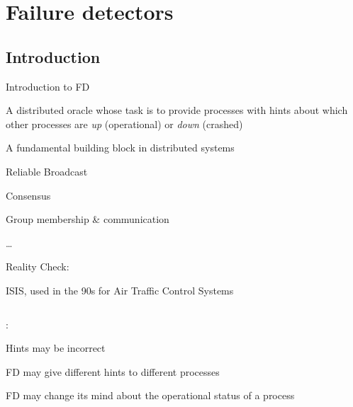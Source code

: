 \section{Failure detectors}

\subsection{Introduction}

\begin{frame}{Introduction to FD}

\begin{definition}
A \alert{distributed oracle} whose task is to provide processes with \alert{hints} about which other processes
are \emph{up} (operational) or \emph{down} (crashed)
\end{definition}

\begin{overprint}

\BIL
\item A fundamental building block in distributed systems
  \BI
  \item \alert{Reliable Broadcast}
  \item \alert{Consensus}
  \item Group membership \& communication
  \item \ldots
  \EI
\item Reality Check:
  \BI
  \item ISIS, used in the 90s for Air Traffic Control Systems
  \EI
\EIL

\begin{columns}[t]
\begin{column}{0.65\textwidth}

:

\BIL
\item Hints may be incorrect
\item FD may give different hints to different processes
\item FD may change its mind about the operational status of a process	
\EIL	
\end{column}

\begin{column}{0.35\textwidth}


\end{column}
\end{columns}
\end{overprint}
\end{frame}
